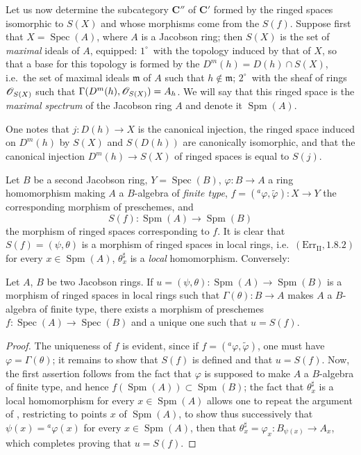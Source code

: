 \begin{env}[10.9.3]
\label{IV.10.9.3}
Let us now determine the subcategory $\mathbf{C}''$ of $\mathbf{C}'$ formed by the ringed spaces isomorphic to $S(X)$ and whose morphisms come from the $S(f)$.
Suppose first that $X=\operatorname{Spec}(A)$, where $A$ is a Jacobson ring; then $S(X)$ is the set of \emph{maximal} ideals of $A$, equipped: $1^\circ$~with the topology induced by that of $X$, so that a base for this topology is formed by the $D^m(h)=D(h)\cap S(X)$, i.e.\ the set of maximal ideals $\mathfrak{m}$ of $A$ such that $h\notin\mathfrak{m}$; $2^\circ$~with the sheaf of rings $\mathscr{O}_{S(X)}$ such that $\Gamma(D^m(h),\mathscr{O}_{S(X)})=A_h$.
We will say that this ringed space is the \emph{maximal spectrum} of the Jacobson ring $A$ and denote it $\operatorname{Spm}(A)$.

One notes that $j:D(h)\to X$ is the canonical injection, the ringed space induced on $D^m(h)$ by $S(X)$ and $S(D(h))$ are canonically isomorphic, and that the canonical injection $D^m(h)\to S(X)$ of ringed spaces is equal to $S(j)$.

Let $B$ be a second Jacobson ring, $Y=\operatorname{Spec}(B)$, $\varphi:B\to A$ a ring homomorphism making $A$ a $B$-algebra of \emph{finite type}, $f=({}^a\varphi,\widetilde{\varphi}):X\to Y$ the corresponding morphism of preschemes, and
\[
  S(f):\operatorname{Spm}(A)\to\operatorname{Spm}(B)
\]
the morphism of ringed spaces corresponding to $f$.
It is clear that $S(f)=(\psi,\theta)$ is a morphism of ringed spaces in local rings, i.e.\ $(\mathrm{Err}_{\mathrm{II}},1.8.2)$ for every $x\in\operatorname{Spm}(A)$, $\theta^\sharp_x$ is a \emph{local} homomorphism.
Conversely:
\end{env}

\begin{proposition}[10.9.4]
\label{IV.10.9.4}
Let $A$, $B$ be two Jacobson rings.
If $u=(\psi,\theta):\operatorname{Spm}(A)\to\operatorname{Spm}(B)$ is a morphism of ringed spaces in local rings such that $\Gamma(\theta):B\to A$ makes $A$ a $B$-algebra of finite type, there exists a morphism of preschemes $f:\operatorname{Spec}(A)\to\operatorname{Spec}(B)$ and a unique one such that $u=S(f)$.
\end{proposition}

\begin{proof}
The uniqueness of $f$ is evident, since if $f=({}^a\varphi,\widetilde{\varphi})$, one must have $\varphi=\Gamma(\theta)$; it remains to show that $S(f)$ is defined and that $u=S(f)$.
Now, the first assertion follows from the fact that $\varphi$ is supposed to make $A$ a $B$-algebra of finite type, and hence $f(\operatorname{Spm}(A))\subset\operatorname{Spm}(B)$; the fact that $\theta^\sharp_x$ is a local homomorphism for every $x\in\operatorname{Spm}(A)$ allows one to repeat the argument of , restricting to points $x$ of $\operatorname{Spm}(A)$, to show thus successively that $\psi(x)={}^a\varphi(x)$ for every $x\in\operatorname{Spm}(A)$, then that $\theta^\sharp_x=\varphi_x:B_{\psi(x)}\to A_x$, which completes proving that $u=S(f)$.
\end{proof}

